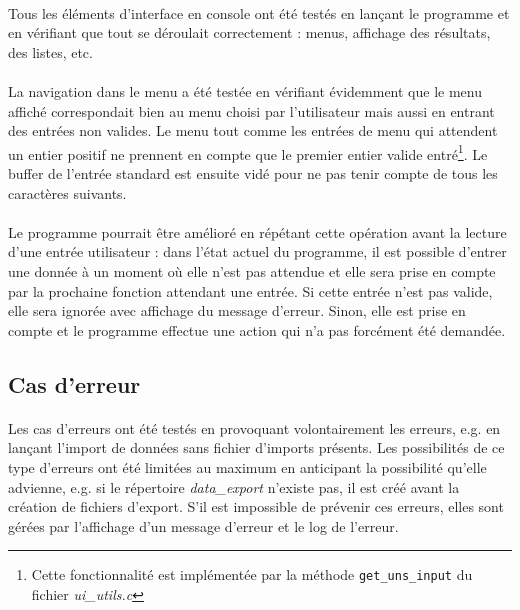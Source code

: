 \documentclass{article}
\begin{document}
    \paragraph{}
    Tous les éléments d'interface en console ont été testés en lançant le programme et en vérifiant que tout se déroulait correctement : menus, affichage des résultats, des listes, etc.
    
    \paragraph{}
    La navigation dans le menu a été testée en vérifiant évidemment que le menu affiché correspondait bien au menu choisi par l'utilisateur mais aussi en entrant des entrées non valides. Le menu tout comme les entrées de menu qui attendent un entier positif ne prennent en compte que le premier entier valide entré\footnote{Cette fonctionnalité est implémentée par la méthode \texttt{get\_uns\_input} du fichier \emph{ui\_utils.c}}. Le buffer de l'entrée standard est ensuite vidé pour ne pas tenir compte de tous les caractères suivants.
    
    \paragraph{}
    Le programme pourrait être amélioré en répétant cette opération avant la lecture d'une entrée utilisateur : dans l'état actuel du programme, il est possible d'entrer une donnée à un moment où elle n'est pas attendue et elle sera prise en compte par la prochaine fonction attendant une entrée. Si cette entrée n'est pas valide, elle sera ignorée avec affichage du message d'erreur. Sinon, elle est prise en compte et le programme effectue une action qui n'a pas forcément été demandée.


    \subsection{Cas d'erreur}
    \paragraph{}
    Les cas d'erreurs ont été testés en provoquant volontairement les erreurs, e.g. en lançant l'import de données sans fichier d'imports présents. Les possibilités de ce type d'erreurs ont été limitées au maximum en anticipant la possibilité qu'elle advienne, e.g. si le répertoire \emph{data\_export} n'existe pas, il est créé avant la création de fichiers d'export. S'il est impossible de prévenir ces erreurs, elles sont gérées par l'affichage d'un message d'erreur et le log de l'erreur.
\end{document}
